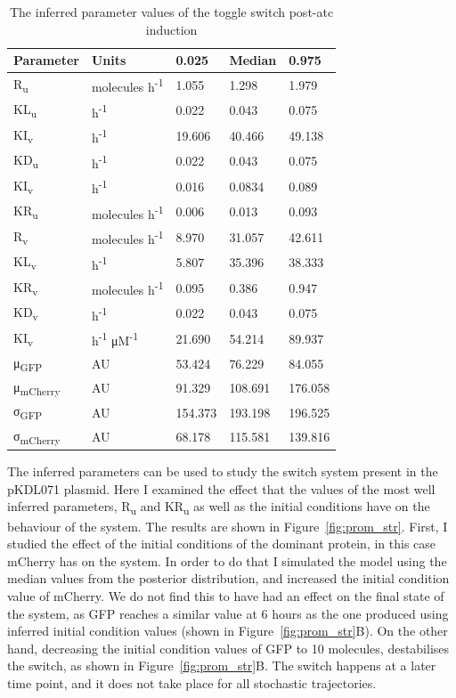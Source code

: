 \begin{table}[htb]
\centering
\caption{The inferred parameter values of the toggle switch post-\acrshort{atc} induction}
\label{tab:inf_params_atc}
\begin{tabular}{@{}lllll@{}}
\toprule
Parameter & Units &0.025 & Median & 0.975 \\ \midrule
R\textsubscript{u} &molecules h\textsuperscript{-1}& 1.055 & 1.298 & 1.979 \\
KL\textsubscript{u} &h\textsuperscript{-1}& 0.022 & 0.043 & 0.075 \\
KI\textsubscript{v} &h\textsuperscript{-1}& 19.606 & 40.466 & 49.138 \\
KD\textsubscript{u} &h\textsuperscript{-1}& 0.022 & 0.043 & 0.075 \\
KI\textsubscript{v} &h\textsuperscript{-1}& 0.016 & 0.0834 & 0.089 \\
KR\textsubscript{u} &molecules h\textsuperscript{-1}& 0.006 & 0.013 & 0.093 \\
R\textsubscript{v} &molecules h\textsuperscript{-1}& 8.970 & 31.057 & 42.611 \\
KL\textsubscript{v} &h\textsuperscript{-1}& 5.807 & 35.396 & 38.333 \\
KR\textsubscript{v} &molecules h\textsuperscript{-1}& 0.095 & 0.386 & 0.947 \\
KD\textsubscript{v} &h\textsuperscript{-1}& 0.022 & 0.043 & 0.075 \\
KI\textsubscript{v} &h\textsuperscript{-1} μM\textsuperscript{-1}& 21.690 & 54.214 & 89.937 \\
μ\textsubscript{GFP} &AU& 53.424 & 76.229 & 84.055 \\
μ\textsubscript{mCherry} &AU& 91.329 & 108.691 & 176.058 \\
σ\textsubscript{GFP} &AU& 154.373 & 193.198 & 196.525 \\
σ\textsubscript{mCherry} &AU& 68.178 & 115.581 & 139.816 \\ \bottomrule
\end{tabular}
\end{table}

The inferred parameters can be used to study the switch system present in the pKDL071 plasmid. Here I examined the effect that the values of the most well inferred parameters, R\textsubscript{u} and KR\textsubscript{u} as well as the initial conditions have on the behaviour of the system. The results are shown in Figure~\ref{fig:prom_str}. First, I studied the effect of the initial conditions of the dominant protein, in this case mCherry has on the system. In order to do that I simulated the model using the median values from the posterior distribution, and increased the initial condition value of mCherry. We do not find this to have had an effect on the final state of the system, as GFP reaches a similar value at 6 hours as the one produced using inferred initial condition values (shown in Figure~\ref{fig:prom_str}B). On the other hand, decreasing the initial condition values of GFP to 10 molecules, destabilises the switch, as shown in Figure~\ref{fig:prom_str}B. The switch happens at a later time point, and it does not take place for all stochastic trajectories.   

